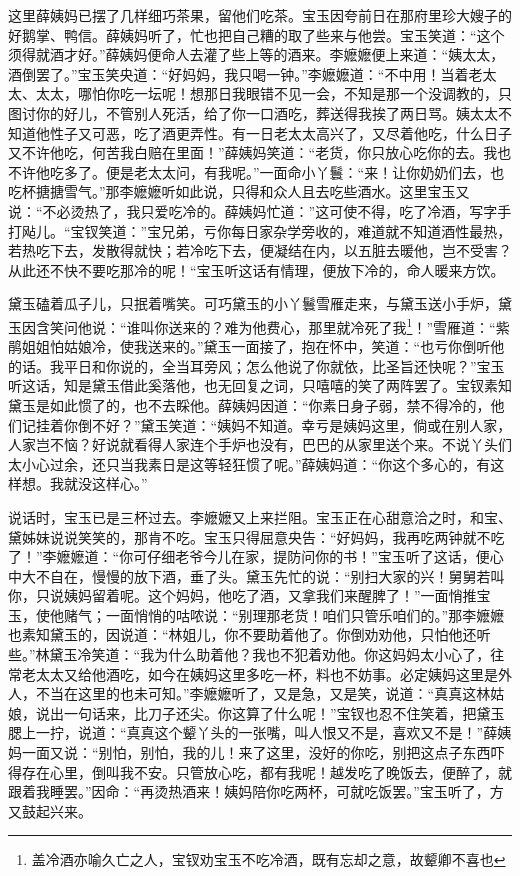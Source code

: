 \documentclass[12pt,oneside]{book}
\begin{document}
这里薛姨妈已摆了几样细巧茶果，留他们吃茶。宝玉因夸前日在那府里珍大嫂子的好鹅掌、鸭信。薛姨妈听了，忙也把自己糟的取了些来与他尝。宝玉笑道：“这个须得就酒才好。”薛姨妈便命人去灌了些上等的酒来。李嬷嬷便上来道：“姨太太，酒倒罢了。”宝玉笑央道：“好妈妈，我只喝一钟。”李嬷嬷道：“不中用！当着老太太、太太，哪怕你吃一坛呢！想那日我眼错不见一会，不知是那一个没调教的，只图讨你的好儿，不管别人死活，给了你一口酒吃，葬送得我挨了两日骂。姨太太不知道他性子又可恶，吃了酒更弄性。有一日老太太高兴了，又尽着他吃，什么日子又不许他吃，何苦我白赔在里面！”薛姨妈笑道：“老货，你只放心吃你的去。我也不许他吃多了。便是老太太问，有我呢。”一面命小丫鬟：“来！让你奶奶们去，也吃杯搪搪雪气。”那李嬷嬷听如此说，只得和众人且去吃些酒水。这里宝玉又说：“不必烫热了，我只爱吃冷的。薛姨妈忙道：”这可使不得，吃了冷酒，写字手打飐儿。“宝钗笑道：”宝兄弟，亏你每日家杂学旁收的，难道就不知道酒性最热，若热吃下去，发散得就快；若冷吃下去，便凝结在内，以五脏去暖他，岂不受害？从此还不快不要吃那冷的呢！“宝玉听这话有情理，便放下冷的，命人暖来方饮。

黛玉磕着瓜子儿，只抿着嘴笑。可巧黛玉的小丫鬟雪雁走来，与黛玉送小手炉，黛玉因含笑问他说：“谁叫你送来的？难为他费心，那里就冷死了我\footnote{盖冷酒亦喻久亡之人，宝钗劝宝玉不吃冷酒，既有忘却之意，故颦卿不喜也}！”雪雁道：“紫鹃姐姐怕姑娘冷，使我送来的。”黛玉一面接了，抱在怀中，笑道：“也亏你倒听他的话。我平日和你说的，全当耳旁风；怎么他说了你就依，比圣旨还快呢？”宝玉听这话，知是黛玉借此奚落他，也无回复之词，只嘻嘻的笑了两阵罢了。宝钗素知黛玉是如此惯了的，也不去睬他。薛姨妈因道：“你素日身子弱，禁不得冷的，他们记挂着你倒不好？”黛玉笑道：“姨妈不知道。幸亏是姨妈这里，倘或在别人家，人家岂不恼？好说就看得人家连个手炉也没有，巴巴的从家里送个来。不说丫头们太小心过余，还只当我素日是这等轻狂惯了呢。”薛姨妈道：“你这个多心的，有这样想。我就没这样心。”

说话时，宝玉已是三杯过去。李嬷嬷又上来拦阻。宝玉正在心甜意洽之时，和宝、黛姊妹说说笑笑的，那肯不吃。宝玉只得屈意央告：“好妈妈，我再吃两钟就不吃了！”李嬷嬷道：“你可仔细老爷今儿在家，提防问你的书！”宝玉听了这话，便心中大不自在，慢慢的放下酒，垂了头。黛玉先忙的说：“别扫大家的兴！舅舅若叫你，只说姨妈留着呢。这个妈妈，他吃了酒，又拿我们来醒脾了！”一面悄推宝玉，使他赌气；一面悄悄的咕哝说：“别理那老货！咱们只管乐咱们的。”那李嬷嬷也素知黛玉的，因说道：“林姐儿，你不要助着他了。你倒劝劝他，只怕他还听些。”林黛玉冷笑道：“我为什么助着他？我也不犯着劝他。你这妈妈太小心了，往常老太太又给他酒吃，如今在姨妈这里多吃一杯，料也不妨事。必定姨妈这里是外人，不当在这里的也未可知。”李嬷嬷听了，又是急，又是笑，说道：“真真这林姑娘，说出一句话来，比刀子还尖。你这算了什么呢！”宝钗也忍不住笑着，把黛玉腮上一拧，说道：“真真这个颦丫头的一张嘴，叫人恨又不是，喜欢又不是！”薛姨妈一面又说：“别怕，别怕，我的儿！来了这里，没好的你吃，别把这点子东西吓得存在心里，倒叫我不安。只管放心吃，都有我呢！越发吃了晚饭去，便醉了，就跟着我睡罢。”因命：“再烫热酒来！姨妈陪你吃两杯，可就吃饭罢。”宝玉听了，方又鼓起兴来。
\end{document}
